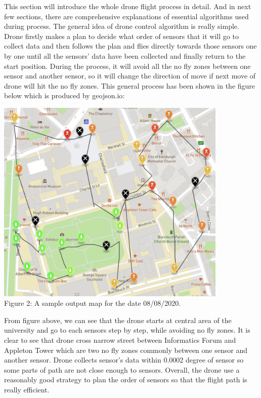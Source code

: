 \documentclass[12pt]{article}
\begin{document}
This section will introduce the whole drone flight process in detail. And in next few sections, there are comprehensive explanations of essential algorithms used during process. The general idea of drone control algorithm is really simple. Drone firstly makes a plan to decide what order of sensors that it will go to collect data and then follows the plan and flies directly towards those sensors one by one until all the sensors' data have been collected and finally return to the start position. During the process, it will avoid all the no fly zones between one sensor and another sensor, so it will change the direction of move if next move of drone will hit the no fly zones. This general process has been shown in the figure below which is produced by geojson.io:
\begin{center}
\includegraphics[width=0.83\textwidth]{2020-08-08.png}\\
\caption{Figure 2: A sample output map for the date 08/08/2020.}
\end{center}
From figure above, we can see that the drone starts at central area of the university and go to each sensors step by step, while avoiding no fly zones. It is clear to see that drone cross narrow street between Informatics Forum and Appleton Tower which are two no fly zones commonly between one sensor and another sensor. Drone collects sensor's data within 0.0002 degree of sensor so some parts of path are not close enough to sensors. Overall, the drone use a reasonably good strategy to plan the order of sensors so that the flight path is really efficient.
\end{document}
